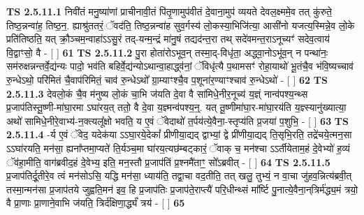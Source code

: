 \documentclass[17pt]{extarticle}
\begin{document}
                                        \textbf{ TS 2.5.11.1} \newline
                  निवी॑तं मनु॒ष्या॑णां प्राचीनावी॒तं पि॑तृ॒णामुप॑वीतं दे॒वाना॒मुप॑ व्ययते देवल॒क्ष्ममे॒व तत् कु॑रुते॒ तिष्ठ॒न्नन्वा॑ह॒ तिष्ठ॒न॒. ह्याश्रु॑ततरं॒ ॅवद॑ति॒ तिष्ठ॒न्नन्वा॑ह सुव॒र्गस्य॑ लो॒कस्या॒भिजि॑त्या॒ आसी॑नो यजत्य॒स्मिन्ने॒व लो॒के प्रति॑तिष्ठति॒ यत् क्रौ॒ञ्चम॒न्वाहा॑ऽऽसु॒रं तद्-यन्म॒न्द्रं मा॑नु॒षं तद्यद॑न्त॒रा तथ् सदे॑वमन्त॒राऽनूच्यꣳ॑ सदेव॒त्वाय॑ वि॒द्वाꣳसो॒ वै - [  ] \textbf{  61} \newline
                  \newline
                                \textbf{ TS 2.5.11.2} \newline
                  पु॒रा होता॑रोऽभूव॒न् तस्मा॒द्-विधृ॑ता॒ अद्ध्वा॒नोऽभू॑व॒न् न पन्था॑नः॒ सम॑रुक्षन्नन्तर्वे॒द्य॑न्यः पादो॒ भव॑ति बहिर्वे॒द्य॑न्योऽथान्वा॒हाद्ध्व॑नां॒ ॅविधृ॑त्यै प॒थामसꣳ॑ रोहा॒याथो॑ भू॒तंचै॒व भ॑वि॒ष्यच्चाव॑ रु॒न्धेऽथो॒ परि॑मितं चै॒वाप॑रिमितं॒ चाव॑ रु॒न्धेऽथो᳚ ग्रा॒म्याꣳश्चै॒व प॒शूना॑र॒ण्याꣳश्चाव॑ रु॒न्धेऽथो॑ - [  ] \textbf{  62} \newline
                  \newline
                                \textbf{ TS 2.5.11.3} \newline
                  देवलो॒कं चै॒व म॑नुष्य लो॒कं चा॒भि ज॑यति दे॒वा वै सा॑मिधे॒नीर॒नूच्य॑ य॒ज्ञ्ं नान्व॑पश्य॒न्थ्स प्र॒जाप॑तिस्तू॒ष्णी-मा॑घा॒रमा ऽघा॑रय॒त् ततो॒ वै दे॒वा य॒ज्ञ्मन्व॑पश्य॒न्॒. यत् तू॒ष्णीमा॑घा॒र-मा॑घा॒रय॑ति य॒ज्ञ्स्यानु॑ख्यात्या॒ अथो॑ सामिधे॒नीरे॒वाभ्य॑-न॒क्त्यलू᳚क्षो भवति॒ य ए॒वं ॅवेदाथो॑ त॒र्पय॑त्ये॒वैना॒-स्तृप्य॑ति प्र॒जया॑ प॒शुभि॒ - [  ] \textbf{  63} \newline
                  \newline
                                \textbf{ TS 2.5.11.4} \newline
                  -र्य ए॒वं ॅवेद॒ यदेक॑या ऽऽघा॒रये॒देकां᳚ प्रीणीया॒द्यद् द्वाभ्यां॒ द्वे प्री॑णीया॒द्यद् ति॒सृभि॒रति॒ तद्रे॑चये॒त्मन॒सा ऽऽघा॑रयति॒ मन॑सा॒ ह्यना᳚प्तमा॒प्यते॑ ति॒र्यञ्च॒मा घा॑रय॒त्यछ॑म्बट्कारं॒ ॅवाक् च॒ मन॑श्चा ऽऽर्तीयेताम॒हं दे॒वेभ्यो॑ ह॒व्यं ॅव॑हा॒मीति॒ वाग॑ब्रवीद॒हं दे॒वेभ्य॒ इति॒ मन॒स्तौ प्र॒जाप॑तिं प्र॒श्नमै॑ताꣳ॒॒ सो᳚ऽब्रवीत् - [  ] \textbf{  64} \newline
                  \newline
                                \textbf{ TS 2.5.11.5} \newline
                  प्र॒जाप॑तिर्दू॒तीरे॒व त्वं मन॑सोऽसि॒ यद्धि मन॑सा॒ ध्याय॑ति॒ तद्वा॒चा वद॒तीति॒ तत् खलु॒ तुभ्यं॒ न वा॒चा जु॑हव॒न्नित्य॑ब्रवी॒त् तस्मा॒न्मन॑सा प्र॒जाप॑तये जुह्वति॒मन॑ इव॒ हि प्र॒जाप॑तिः प्र॒जाप॑ते॒राप्त्यै॑ परि॒धीन्थ्सं मा᳚र्ष्टि पु॒नात्ये॒वैना॒न्‌त्रिर्म॑द्ध्य॒मं त्रयो॒ वै प्रा॒णाः प्रा॒णाने॒वाभि ज॑यति॒ त्रिर्द॑क्षिणा॒र्द्ध्यं॑ त्रय॑ - [  ] \textbf{  65} \newline
\end{document}
